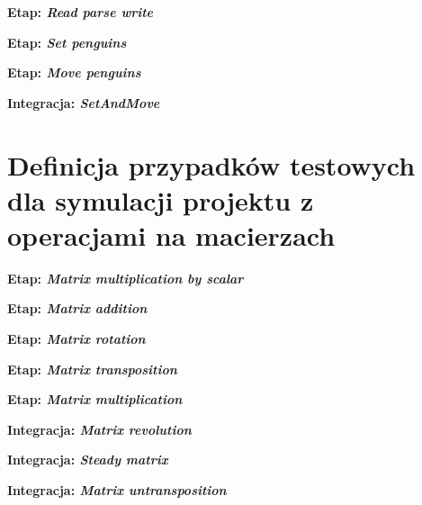 {
\setlength\parindent{0pt}

\large
\textbf{Etap: \textit{Read parse write}}
\normalsize




\large
\textbf{Etap: \textit{Set penguins}}
\normalsize




\large
\textbf{Etap: \textit{Move penguins}}
\normalsize




\large
\textbf{Integracja: \textit{SetAndMove}}
\normalsize


}

\section*{Definicja przypadków testowych dla symulacji projektu z operacjami na macierzach}
\label{file:test_cases_matrix}

{
\setlength\parindent{0pt}

\large
\textbf{Etap: \textit{Matrix multiplication by scalar}}
\normalsize




\large
\textbf{Etap: \textit{Matrix addition}}
\normalsize




\large
\textbf{Etap: \textit{Matrix rotation}}
\normalsize




\large
\textbf{Etap: \textit{Matrix transposition}}
\normalsize




\large
\textbf{Etap: \textit{Matrix multiplication}}
\normalsize




\large
\textbf{Integracja: \textit{Matrix revolution}}
\normalsize




\large
\textbf{Integracja: \textit{Steady matrix}}
\normalsize




\large
\textbf{Integracja: \textit{Matrix untransposition}}
\normalsize


}

\clearpage
